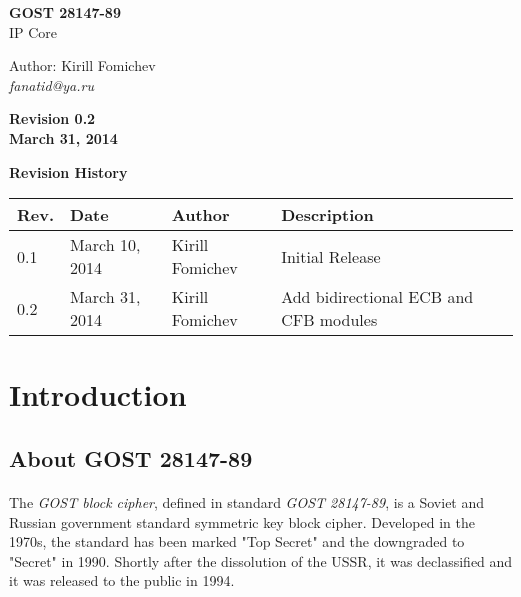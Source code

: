 \documentclass[a4paper,12pt]{article}
\newcommand{\currentRevision}{0.2}
\newcommand{\releaseDate}{March 31, 2014}
\begin{document}
\begin{titlepage}
\begin{flushright}

\vspace*{4cm}
\Huge
\textbf{GOST 28147-89}\\IP Core

\vspace{4cm}
\large
Author: Kirill Fomichev\\
\textsl{fanatid@ya.ru}

\vspace{4cm}
\textbf{Revision \currentRevision\\\releaseDate}

\end{flushright}
\end{titlepage}


\begin{flushright}
\Large
\textbf{Revision History}
\normalsize
\end{flushright}

\begin{flushleft}
{\renewcommand{\arraystretch}{1.5}
\begin{tabularx}{\textwidth}{|l|l|l|X|}
\hline
\textbf{Rev.} & \textbf{Date} & \textbf{Author} & \textbf{Description}\\
\hline
0.1 & March 10, 2014 & Kirill Fomichev & Initial Release\\
\hline
0.2 & March 31, 2014 & Kirill Fomichev & Add bidirectional ECB and CFB modules\\
\hline
\end{tabularx}}
\end{flushleft}

\newpage
\tableofcontents

\newpage
\section{Introduction}

\subsection{About GOST 28147-89}
\paragraph{}
The \textsl{GOST block cipher}, defined in standard \textsl{GOST 28147-89},
is a Soviet and Russian government standard symmetric key block cipher.
Developed in the 1970s, the standard has been marked "Top Secret" and
the downgraded to "Secret" in 1990. Shortly after the dissolution of the USSR,
it was declassified and it was released to the public in 1994.
\end{document}
